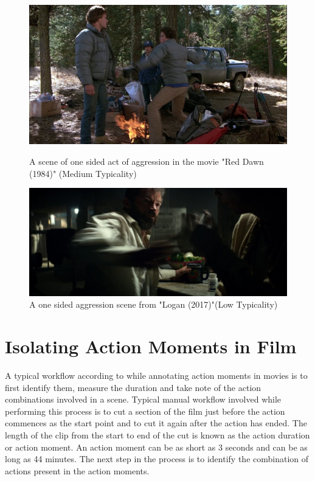 \documentclass[12pt]{report}
\begin{document}
	
	\begin{figure}[h]
		\centering
		\begin{minipage}{0.45\linewidth}
			\centering
			\includegraphics[width=\linewidth]{Red-Dawn-MT-1984.jpg}
			\caption{A scene of one sided act of aggression in the movie "Red Dawn (1984)" (Medium Typicality)  \cite{tico-romao-2024}}
			\label{fig:red_dawn}
		\end{minipage}
		\hspace{0.05\linewidth}  %
		\begin{minipage}{0.45\linewidth}
			\centering
			\includegraphics[width=\linewidth]{Logan-LT-2017.jpg}
			\caption{A one sided aggression scene from "Logan (2017)"(Low Typicality)\cite{tico-romao-2024}}
			\label{fig:logan}
		\end{minipage}
	\end{figure}
	
	\section{Isolating Action Moments in Film}
	A typical workflow according to \cite{tico-romao-2024} while annotating action moments in movies is to first identify them, measure the duration and take note of the action combinations involved in a scene. Typical manual workflow involved while performing this process is to cut a section of the film just before the action commences as the start point and to cut it again after the action has ended. The length of the clip from the start to end of the cut is known as the action duration or action moment. An action moment can be as short as 3 seconds and can be as long as 44 minutes. The next step in the process is to identify the combination of actions present in the action moments.
	
\end{document}
